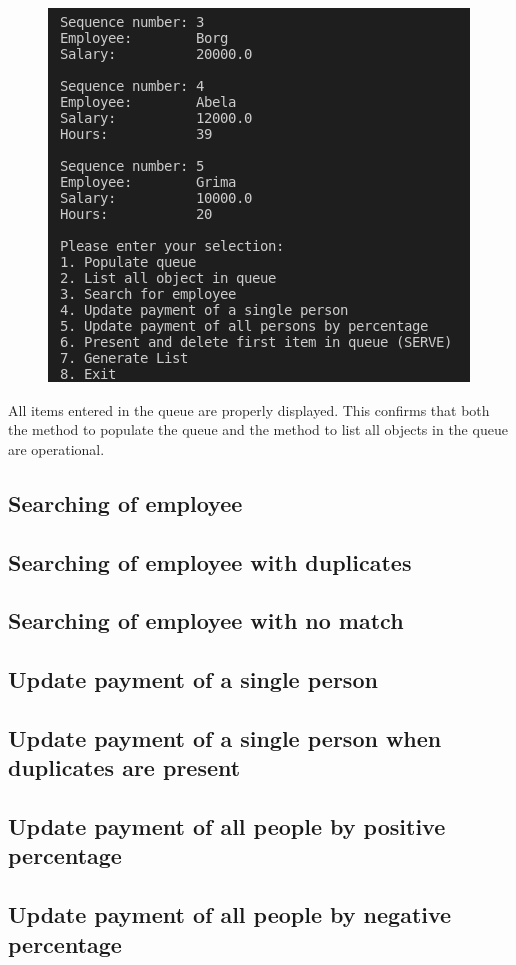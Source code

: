 \documentclass[12pt]{article}
\begin{document}
\begin{figure}[h]
\centering
\includegraphics[scale=0.30]{Images/Testing 1/2.png}
\end{figure}

All items entered in the queue are properly displayed. This confirms that both the method to populate the queue and the method to list all objects in the queue are operational.
\subsection{Searching of employee}
\subsection{Searching of employee with duplicates}
\subsection{Searching of employee with no match}
\subsection{Update payment of a single person}
\subsection{Update payment of a single person when duplicates are present}
\subsection{Update payment of all people by positive percentage}
\subsection{Update payment of all people by negative percentage}
\end{document}
